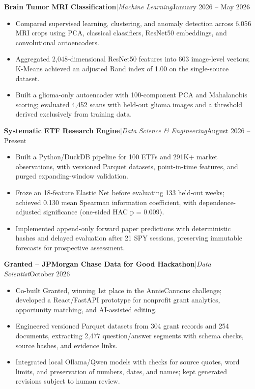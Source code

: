 \documentclass[11pt,letterpaper]{article}
\newcommand{\ressection}[1]{\vspace{6pt}{\fontsize{12}{13}\selectfont\bfseries\scshape #1}\par\vspace{1pt}}
\newcommand{\project}[3]{\textbf{#1}\enspace|\enspace\textit{#2}\hfill #3\par}
\begin{document}
\ressection{Selected Projects}
\project{Brain Tumor MRI Classification}{Machine Learning}{January 2026 -- May 2026}
\begin{itemize}
  \item Compared supervised learning, clustering, and anomaly detection across 6,056 MRI crops using PCA, classical classifiers, ResNet50 embeddings, and convolutional autoencoders.
  \item Aggregated 2,048-dimensional ResNet50 features into 603 image-level vectors; K-Means achieved an adjusted Rand index of 1.00 on the single-source dataset.
  \item Built a glioma-only autoencoder with 100-component PCA and Mahalanobis scoring; evaluated 4,452 scans with held-out glioma images and a threshold derived exclusively from training data.
\end{itemize}
\vspace{3pt}
\project{Systematic ETF Research Engine}{Data Science \& Engineering}{August 2026 -- Present}
\begin{itemize}
  \item Built a Python/DuckDB pipeline for 100 ETFs and 291K+ market observations, with versioned Parquet datasets, point-in-time features, and purged expanding-window validation.
  \item Froze an 18-feature Elastic Net before evaluating 133 held-out weeks; achieved 0.130 mean Spearman information coefficient, with dependence-adjusted significance (one-sided HAC p = 0.009).
  \item Implemented append-only forward paper predictions with deterministic hashes and delayed evaluation after 21 SPY sessions, preserving immutable forecasts for prospective assessment.
\end{itemize}
\vspace{3pt}
\project{Granted -- JPMorgan Chase Data for Good Hackathon}{Data Scientist}{October 2026}
\begin{itemize}
  \item Co-built Granted, winning 1st place in the AnnieCannons challenge; developed a React/FastAPI prototype for nonprofit grant analytics, opportunity matching, and AI-assisted editing.
  \item Engineered versioned Parquet datasets from 304 grant records and 254 documents, extracting 2,477 question/answer segments with schema checks, source hashes, and evidence links.
  \item Integrated local Ollama/Qwen models with checks for source quotes, word limits, and preservation of numbers, dates, and names; kept generated revisions subject to human review.
\end{itemize}
\end{document}
